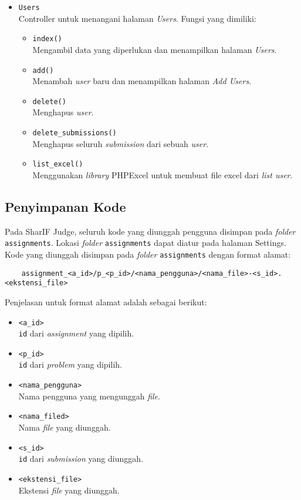 \begin{itemize}
	\item \verb|Users| \\ Controller untuk menangani halaman \textit{Users}. Fungsi yang dimiliki:
	\begin{itemize}
        \item \verb|index()| \\ Mengambil data yang diperlukan dan menampilkan halaman \textit{Users}.
        \item \verb|add()| \\ Menambah \textit{user} baru dan menampilkan halaman \textit{Add Users}.
        \item \verb|delete()| \\ Menghapus \textit{user}.
        \item \verb|delete_submissions()| \\ Menghapus seluruh \textit{submission} dari sebuah \textit{user}.
         \item \verb|list_excel()| \\ Menggunakan \textit{library} PHPExcel untuk membuat file excel dari \textit{list user}.
	\end{itemize}
\end{itemize}

\subsection{Penyimpanan Kode}
\label{subsec:3:simpan}

Pada SharIF Judge, seluruh kode yang diunggah pengguna disimpan pada \textit{folder} \verb|assignments|. Lokasi \textit{folder} \verb|assignments| dapat diatur pada halaman Settings. Kode yang diunggah disimpan pada \textit{folder} \verb|assignments| dengan format alamat:
\begin{verbatim}
    assignment_<a_id>/p_<p_id>/<nama_pengguna>/<nama_file>-<s_id>.<ekstensi_file>
\end{verbatim}
Penjelasan untuk format alamat adalah sebagai berikut:
\begin{itemize}
    \item \verb|<a_id>| \\ \verb|id| dari \textit{assignment} yang dipilih.
    \item \verb|<p_id>| \\ \verb|id| dari \textit{problem} yang dipilih.
    \item \verb|<nama_pengguna>| \\ Nama pengguna yang mengunggah \textit{file}.
    \item \verb|<nama_filed>| \\ Nama \textit{file} yang diunggah.
    \item \verb|<s_id>| \\ \verb|id| dari \textit{submission} yang diunggah.
    \item \verb|<ekstensi_file>| \\ Ekstensi \textit{file} yang diunggah.
\end{itemize}

